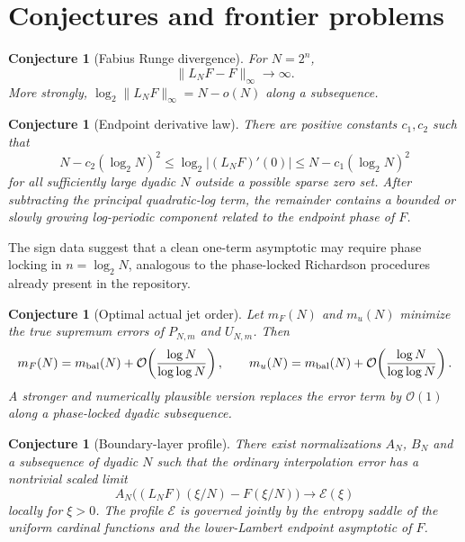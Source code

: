 \documentclass[11pt,oneside]{article}
\numberwithin{equation}{section}
\newtheorem{conjecture}[theorem]{Conjecture}
\theoremstyle{definition}
\theoremstyle{remark}
\newcommand{\bigO}{\mathcal O}
\begin{document}
\section{Conjectures and frontier problems}
\label{sec:conjectures}

\begin{conjecture}[Fabius Runge divergence]
\label{conj:runge}
For $N=2^n$,
\begin{equation}
 \lVert L_NF-F\rVert_\infty\longrightarrow\infty.
\end{equation}
More strongly, $\log_2\lVert L_NF\rVert_\infty=N-o(N)$ along a subsequence.
\end{conjecture}

\begin{conjecture}[Endpoint derivative law]
\label{conj:derivative}
There are positive constants $c_1,c_2$ such that
\begin{equation}
 N-c_2(\log_2N)^2
 \le \log_2|(L_NF)'(0)|
 \le N-c_1(\log_2N)^2
 \label{eq:derivative-conjecture}
\end{equation}
for all sufficiently large dyadic $N$ outside a possible sparse zero set.  After subtracting
the principal quadratic-log term, the remainder contains a bounded or slowly growing
log-periodic component related to the endpoint phase of $F$.
\end{conjecture}

The sign data suggest that a clean one-term asymptotic may require phase locking in
$n=\log_2N$, analogous to the phase-locked Richardson procedures already present in the
repository.

\begin{conjecture}[Optimal actual jet order]
\label{conj:optimal-m}
Let $m_F(N)$ and $m_u(N)$ minimize the true supremum errors of $P_{N,m}$ and $U_{N,m}$.
Then
\begin{equation}
 m_F(N)=m_{\rm bal}(N)+\bigO\!\left(\frac{\log N}{\log\log N}\right),
 \qquad
 m_u(N)=m_{\rm bal}(N)+\bigO\!\left(\frac{\log N}{\log\log N}\right).
 \label{eq:optimal-m-conjecture}
\end{equation}
A stronger and numerically plausible version replaces the error term by $\bigO(1)$ along a
phase-locked dyadic subsequence.
\end{conjecture}

\begin{conjecture}[Boundary-layer profile]
\label{conj:boundary-profile}
There exist normalizations $A_N$, $B_N$ and a subsequence of dyadic $N$ such that the
ordinary interpolation error has a nontrivial scaled limit
\begin{equation}
 A_N\bigl((L_NF)(\xi/N)-F(\xi/N)\bigr)
 \longrightarrow \mathcal E(\xi)
 \label{eq:boundary-profile-conjecture}
\end{equation}
locally for $\xi>0$.  The profile $\mathcal E$ is governed jointly by the entropy saddle of
the uniform cardinal functions and the lower-Lambert endpoint asymptotic of $F$.
\end{conjecture}
\end{document}
